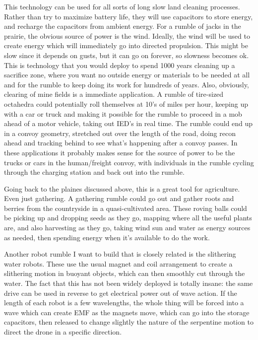 This technology can be used for all sorts of long slow land cleaning
processes. Rather than try to maximize battery life, they will use
capacitors to store energy, and recharge the capacitors from ambient
energy. For a rumble of jacks in the prairie, the obvious source of
power is the wind. Ideally, the wind will be used to create energy which
will immediately go into directed propulsion. This might be slow since
it depends on gusts, but it can go on forever, so slowness becomes ok.
This is technology that you would deploy to spend 1000 years cleaning up
a sacrifice zone, where you want no outside energy or materials to be
needed at all and for the rumble to keep doing its work for hundreds of
years. Also, obviously, clearing of mine fields is a immediate
application. A rumble of tire-sized octahedra could potentially roll
themselves at 10's of miles per hour, keeping up with a car or truck and
making it possible for the rumble to proceed in a mob ahead of a motor
vehicle, taking out IED's in real time. The rumble could end up in a
convoy geometry, stretched out over the length of the road, doing recon
ahead and tracking behind to see what's happening after a convoy passes.
In these applications it probably makes sense for the source of power to
be the trucks or cars in the human/freight convoy, with individuals in
the rumble cycling through the charging station and back out into the
rumble.

Going back to the plaines discussed above, this is a great tool for
agriculture. Even just gathering. A gathering rumble could go out and
gather roots and berries from the countryside in a quasi-cultivated
area. These roving balls could be picking up and dropping seeds as they
go, mapping where all the useful plants are, and also harvesting as they
go, taking wind sun and water as energy sources as needed, then spending
energy when it's available to do the work.

Another robot rumble I want to build that is closely related is the
slithering water robots. These use the usual magnet and coil arrangement
to create a slithering motion in buoyant objects, which can then
smoothly cut through the water. The fact that this has not been widely
deployed is totally insane: the same drive can be used in reverse to get
electrical power out of wave action. If the length of each robot is a
few wavelengths, the whole thing will be forced into a wave which can
create EMF as the magnets move, which can go into the storage
capacitors, then released to change slightly the nature of the
serpentine motion to direct the drone in a specific direction.

